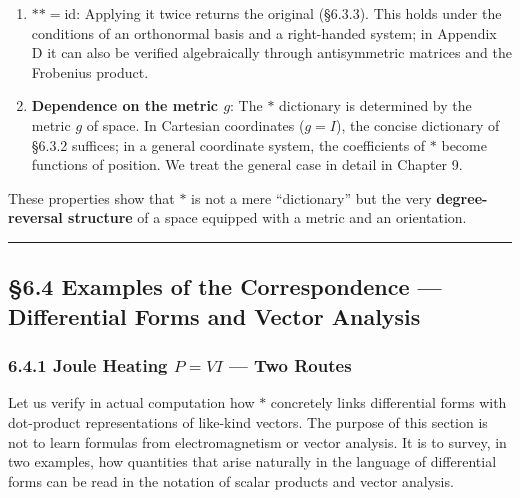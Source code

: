 \begin{enumerate}
\def\labelenumi{\arabic{enumi}.}
\setcounter{enumi}{3}
\item
  \textbf{$\ast\ast = \mathrm{id}$}: Applying it twice returns the
  original (§6.3.3). This holds under the conditions of an orthonormal
  basis and a right-handed system; in Appendix D it can also be verified
  algebraically through antisymmetric matrices and the Frobenius
  product.
\item
  \textbf{Dependence on the metric $g$}: The \(\ast\) dictionary is
  determined by the metric \(g\) of space. In Cartesian coordinates
  (\(g=I\)), the concise dictionary of §6.3.2 suffices; in a general
  coordinate system, the coefficients of \(\ast\) become functions of
  position. We treat the general case in detail in Chapter 9.
\end{enumerate}

These properties show that \(\ast\) is not a mere ``dictionary'' but the
very \textbf{degree-reversal structure} of a space equipped with a
metric and an orientation.

\begin{center}\rule{0.5\linewidth}{0.5pt}\end{center}

\hypertarget{examples-of-the-correspondence-differential-forms-and-vector-analysis}{%
\subsection{§6.4 Examples of the Correspondence --- Differential Forms
and Vector
Analysis}\label{examples-of-the-correspondence-differential-forms-and-vector-analysis}}

\hypertarget{joule-heating-pvi-two-routes}{%
\subsubsection{\texorpdfstring{6.4.1 Joule Heating \(P=VI\) --- Two
Routes}{6.4.1 Joule Heating P=VI --- Two Routes}}\label{joule-heating-pvi-two-routes}}

Let us verify in actual computation how \(\ast\) concretely links
differential forms with dot-product representations of like-kind
vectors. The purpose of this section is not to learn formulas from
electromagnetism or vector analysis. It is to survey, in two examples,
how quantities that arise naturally in the language of differential
forms can be read in the notation of scalar products and vector
analysis.

